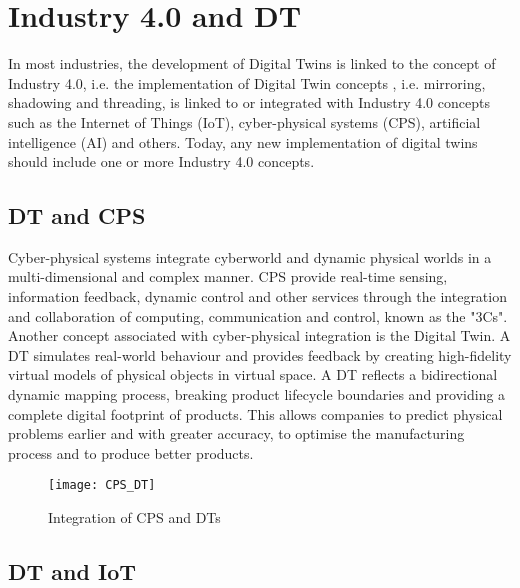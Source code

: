 \section{Industry 4.0 and DT}
In most industries, the development of Digital Twins is linked
to the concept of Industry 4.0, i.e. the implementation of Digital Twin concepts
, i.e. mirroring, shadowing and threading, is linked to or integrated with Industry 4.0 concepts
such as the Internet of Things (IoT), cyber-physical systems (CPS), artificial intelligence (AI) and others.
Today, any new implementation of digital twins should include one or more Industry 4.0 concepts.\cite{pires2019digital} \\

\subsection{DT and CPS}
Cyber-physical systems integrate cyberworld and dynamic physical worlds in a multi-dimensional and complex manner. CPS provide real-time sensing, information feedback, dynamic control and other services through the integration and collaboration of computing, communication and control, known as the "3Cs".\cite{alam2017c2ps}
\\ Another concept associated with cyber-physical integration is the Digital Twin. A DT simulates real-world behaviour and provides feedback by creating high-fidelity virtual models of physical objects in virtual space.
A DT reflects a bidirectional dynamic mapping process, breaking product lifecycle boundaries and providing a complete digital footprint of products.\cite{alam2017c2ps}
This allows companies to predict physical problems earlier and with greater accuracy, to optimise the manufacturing process and to produce better products.\cite{alam2017c2ps}

\begin{figure}[h]
    \centering
    \texttt{[image: CPS\_DT]}
    \caption{Integration of CPS and DTs}
    \label{fig:mesh1}
\end{figure}

\newpage

\subsection{DT and IoT}